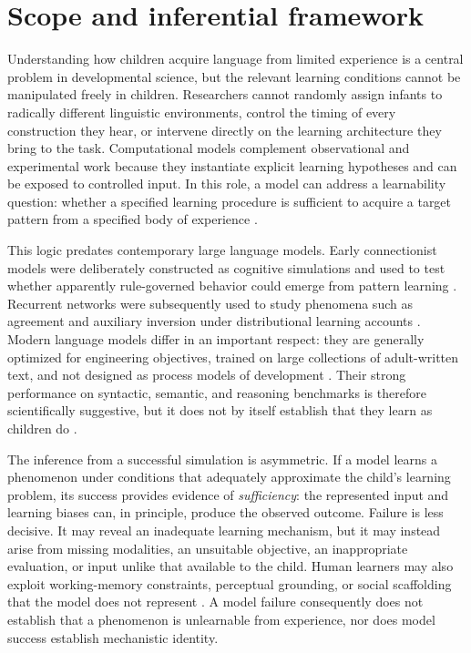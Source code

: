 \section{Scope and inferential framework}
\label{sec:litreview:framework}

Understanding how children acquire language from limited experience is a central problem in developmental science, but the relevant learning conditions cannot be manipulated freely in children. Researchers cannot randomly assign infants to radically different linguistic environments, control the timing of every construction they hear, or intervene directly on the learning architecture they bring to the task. Computational models complement observational and experimental work because they instantiate explicit learning hypotheses and can be exposed to controlled input. In this role, a model can address a learnability question: whether a specified learning procedure is sufficient to acquire a target pattern from a specified body of experience \citep{Chater2008,Perfors2011,dupoux2018cognitive}.

This logic predates contemporary large language models. Early connectionist models were deliberately constructed as cognitive simulations and used to test whether apparently rule-governed behavior could emerge from pattern learning \citep{RumelhartMcClelland1986,Elman1990}. Recurrent networks were subsequently used to study phenomena such as agreement and auxiliary inversion under distributional learning accounts \citep{Elman1991,Lewis2001,Reali2004}. Modern language models differ in an important respect: they are generally optimized for engineering objectives, trained on large collections of adult-written text, and not designed as process models of development \citep{Brown2020,Warstadt2022}. Their strong performance on syntactic, semantic, and reasoning benchmarks is therefore scientifically suggestive, but it does not by itself establish that they learn as children do \citep{Linzen2021,Mahowald2024}.

The inference from a successful simulation is asymmetric. If a model learns a phenomenon under conditions that adequately approximate the child's learning problem, its success provides evidence of \emph{sufficiency}: the represented input and learning biases can, in principle, produce the observed outcome. Failure is less decisive. It may reveal an inadequate learning mechanism, but it may instead arise from missing modalities, an unsuitable objective, an inappropriate evaluation, or input unlike that available to the child. Human learners may also exploit working-memory constraints, perceptual grounding, or social scaffolding that the model does not represent \citep{Tomasello2003,Warstadt2022,Wilcox2024}. A model failure consequently does not establish that a phenomenon is unlearnable from experience, nor does model success establish mechanistic identity.

